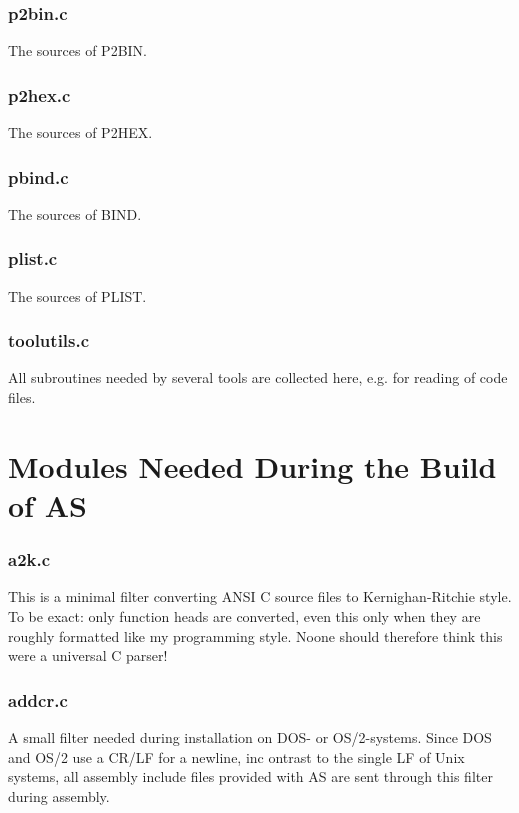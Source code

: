 \documentclass[12pt,twoside]{report}
\begin{document}
\subsubsection{p2bin.c}

The sources of P2BIN.

\subsubsection{p2hex.c}

The sources of P2HEX.

\subsubsection{pbind.c}

The sources of BIND.

\subsubsection{plist.c}

The sources of PLIST.

\subsubsection{toolutils.c}

All subroutines needed by several tools are collected here, e.g. for
reading of code files.

\section{Modules Needed During the Build of AS}

\subsubsection{a2k.c}

This is a minimal filter converting ANSI C source files to
Kernighan-Ritchie style.  To be exact: only function heads are converted,
even this only when they are roughly formatted like my programming style. 
Noone should therefore think this were a universal C parser!

\subsubsection{addcr.c}

A small filter needed during installation on DOS- or OS/2-systems.  Since
DOS and OS/2 use a CR/LF for a newline, inc ontrast to the single LF of
Unix systems, all assembly include files provided with AS are sent through
this filter during assembly.
\end{document}
